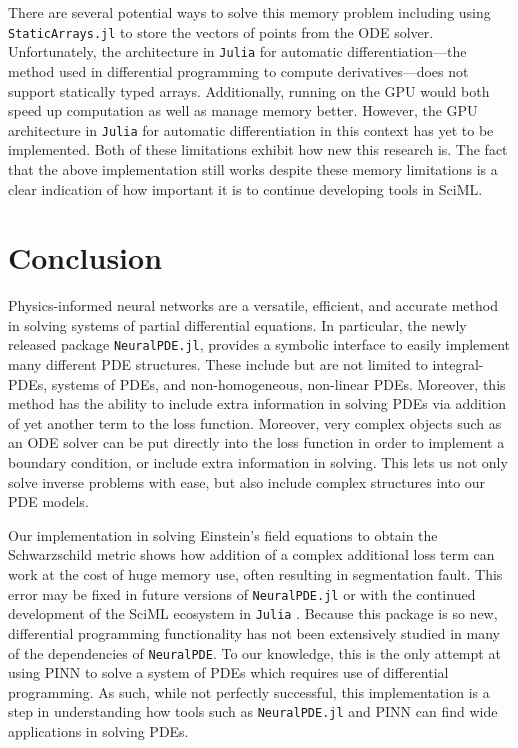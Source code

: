 \documentclass{CUP-JNL-DTM}%
\theoremstyle{definition}
\numberwithin{equation}{section}
\newcommand{\Julia}{\texttt{Julia} }
\begin{document}
There are several potential ways to solve this memory problem including using \texttt{StaticArrays.jl} to store the vectors of points from the ODE solver. Unfortunately, the architecture in \Julia for automatic differentiation---the method used in differential programming to compute derivatives---does not support statically typed arrays. Additionally, running on the GPU would both speed up computation as well as manage memory better. However, the GPU architecture in \Julia for automatic differentiation in this context has yet to be implemented. Both of these limitations exhibit how new this research is. The fact that the above implementation still works despite these memory limitations is a clear indication of how important it is to continue developing tools in SciML. 


\section{Conclusion}

Physics-informed neural networks are a versatile, efficient, and accurate method in solving systems of partial differential equations. In particular, the newly released package \texttt{NeuralPDE.jl}, provides a symbolic interface to easily implement many different PDE structures. These include but are not limited to integral-PDEs, systems of PDEs, and non-homogeneous, non-linear PDEs. Moreover, this method has the ability to include extra information in solving PDEs via addition of yet another term to the loss function. Moreover, very complex objects such as an ODE solver can be put directly into the loss function in order to implement a boundary condition, or include extra information in solving. This lets us not only solve inverse problems with ease, but also include complex structures into our PDE models. 

Our implementation in solving Einstein's field equations to obtain the Schwarzschild metric shows how addition of a complex additional loss term can work at the cost of huge memory use, often resulting in segmentation fault. This error may be fixed in future versions of \texttt{NeuralPDE.jl} or with the continued development of the SciML ecosystem in \Julia. Because this package is so new, differential programming functionality has not been extensively studied in many of the dependencies of \texttt{NeuralPDE}. To our knowledge, this is the only attempt at using PINN to solve a system of PDEs which requires use of differential programming. As such, while not perfectly successful, this implementation is a step in understanding how tools such as \texttt{NeuralPDE.jl} and PINN can find wide applications in solving PDEs. 
\end{document}

